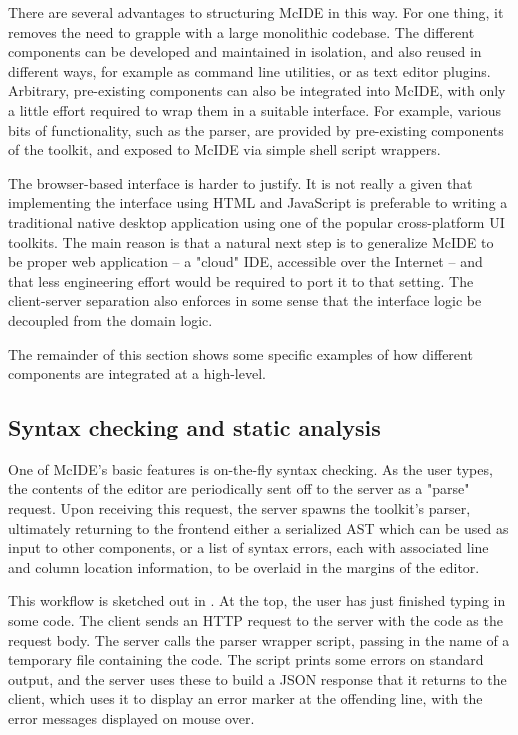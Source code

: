 There are several advantages to structuring McIDE in this way. For one thing,
it removes the need to grapple with a large monolithic codebase. The different
components can be developed and maintained in isolation, and also reused in
different ways, for example as command line utilities, or as text editor
plugins. Arbitrary, pre-existing components can also be integrated into McIDE,
with only a little effort required to wrap them in a suitable interface. For
example, various bits of functionality, such as the parser, are provided by
pre-existing components of the \mclab toolkit, and exposed to McIDE via simple
shell script wrappers.

The browser-based interface is harder to justify. It is not really a given that
implementing the interface using HTML and JavaScript is preferable to writing a
traditional native desktop application using one of the popular cross-platform
UI toolkits. The main reason is that a natural next step is to generalize McIDE
to be proper web application -- a "cloud" IDE, accessible over the Internet --
and that less engineering effort would be required to port it to that setting.
The client-server separation also enforces in some sense that the interface
logic be decoupled from the domain logic.

The remainder of this section shows some specific examples of how different
components are integrated at a high-level.

\subsection{Syntax checking and static analysis}

One of McIDE's basic features is on-the-fly syntax checking. As the user types,
the contents of the editor are periodically sent off to the server as a "parse"
request. Upon receiving this request, the server spawns the \mclab toolkit's
\matlab parser, ultimately returning to the frontend either a serialized AST
which can be used as input to other components, or a list of syntax errors,
each with associated line and column location information, to be overlaid in
the margins of the editor.

This workflow is sketched out in . At the top, the
user has just finished typing in some code. The client sends an HTTP request to
the server with the code as the request body. The server calls the parser
wrapper script, passing in the name of a temporary file containing the code.
The script prints some errors on standard output, and the server uses these to
build a JSON response that it returns to the client, which uses it to display
an error marker at the offending line, with the error messages displayed on
mouse over.

